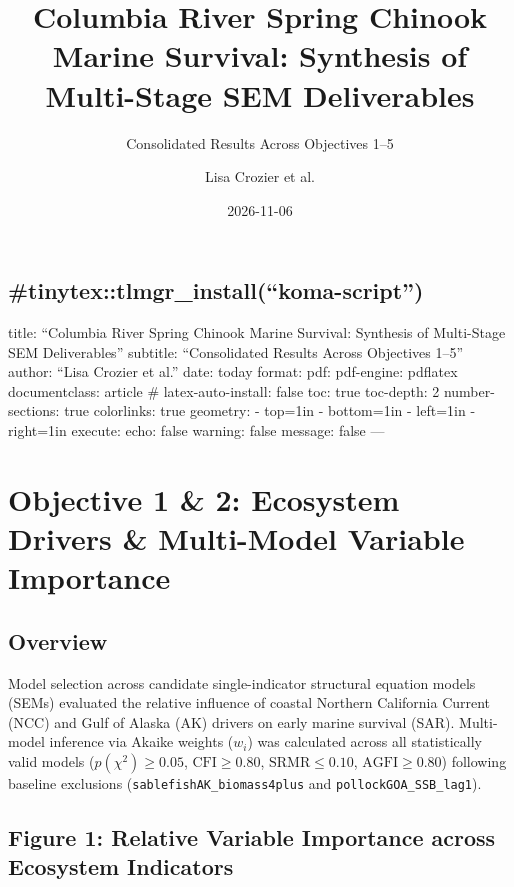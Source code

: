 \documentclass[
]{article}
\title{Columbia River Spring Chinook Marine Survival: Synthesis of
Multi-Stage SEM Deliverables}
\subtitle{Consolidated Results Across Objectives 1--5}
\author{Lisa Crozier et al.}
\date{2026-11-06}
\renewcommand*\contentsname{Table of contents}
\newcommand\contentsname{Table of contents}
\begin{document}
\maketitle

\renewcommand*\contentsname{Table of contents}
{
\setcounter{tocdepth}{2}
\tableofcontents
}

\subsection{\#tinytex::tlmgr\_install(``koma-script'')}\label{tinytextlmgr_installkoma-script}

title: ``Columbia River Spring Chinook Marine Survival: Synthesis of
Multi-Stage SEM Deliverables'' subtitle: ``Consolidated Results Across
Objectives 1--5'' author: ``Lisa Crozier et al.'' date: today format:
pdf: pdf-engine: pdflatex documentclass: article \# latex-auto-install:
false toc: true toc-depth: 2 number-sections: true colorlinks: true
geometry: - top=1in - bottom=1in - left=1in - right=1in execute: echo:
false warning: false message: false ---

\newpage

\section{Objective 1 \& 2: Ecosystem Drivers \& Multi-Model Variable
Importance}\label{objective-1-2-ecosystem-drivers-multi-model-variable-importance}

\subsection{Overview}\label{overview}

Model selection across candidate single-indicator structural equation
models (SEMs) evaluated the relative influence of coastal Northern
California Current (NCC) and Gulf of Alaska (AK) drivers on early marine
survival (SAR). Multi-model inference via Akaike weights (\(w_i\)) was
calculated across all statistically valid models
(\(p(\chi^2) \ge 0.05\), \(\text{CFI} \ge 0.80\),
\(\text{SRMR} \le 0.10\), \(\text{AGFI} \ge 0.80\)) following baseline
exclusions (\texttt{sablefishAK\_biomass4plus} and
\texttt{pollockGOA\_SSB\_lag1}).

\subsection{Figure 1: Relative Variable Importance across Ecosystem
Indicators}\label{figure-1-relative-variable-importance-across-ecosystem-indicators}
\end{document}
